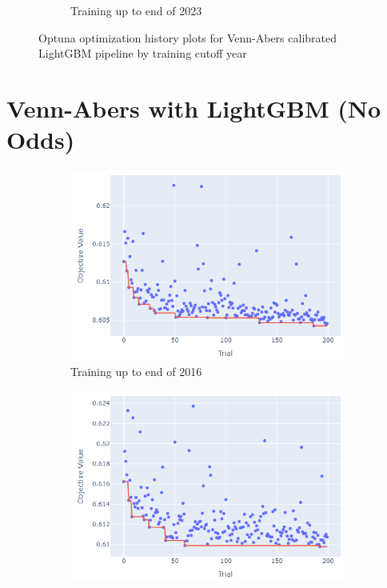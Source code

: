 \documentclass[12pt,twoside]{report}
\begin{document}
\begin{figure}[htb]
\begin{subfigure}{.33\linewidth}
  \caption{Training up to end of 2023}
\end{subfigure}
\par\bigskip
\caption{Optuna optimization history plots for Venn-Abers calibrated LightGBM pipeline by training cutoff year}
\end{figure}

\newpage
\section{Venn-Abers with LightGBM (No Odds)}

\begin{figure}[htb]
\centering
\captionsetup{justification=centering}
\begin{subfigure}{.33\linewidth}
  \centering
  \includegraphics[width=0.95\linewidth]{figures/va_lightgbm_no_odds_cutoff_2016.png}
  \caption{Training up to end of 2016}
\end{subfigure}%
\begin{subfigure}{.33\linewidth}
  \centering
  \includegraphics[width=0.95\linewidth]{figures/va_lightgbm_no_odds_cutoff_2017.png}

\end{subfigure}
\end{figure}
\end{document}
